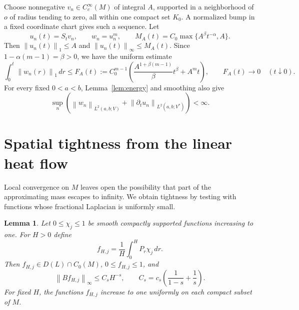 \documentclass[11pt]{article}
\newtheorem{lemma}[theorem]{Lemma}
\theoremstyle{remark}
\newcommand{\norm}[1]{\left\lVert#1\right\rVert}
\begin{document}
Choose nonnegative $v_n\in C_c^\infty(M)$ of integral $A$, supported
in a neighborhood of $o$ of radius tending to zero, all within one
compact set $K_0$. A normalized bump in a fixed coordinate chart gives
such a sequence. Let
\[
 u_n(t)=S_tv_n,\qquad w_n=u_n^m,
 \qquad M_A(t)=C_0\max\{A^\beta t^{-\alpha},A\}.
\]
Then $\norm{u_n(t)}_1\le A$ and $\norm{u_n(t)}_\infty\le M_A(t)$.
Since $1-\alpha(m-1)=\beta>0$, we have the uniform estimate
\begin{equation}\label{eq:flux}
 \int_0^t\norm{w_n(r)}_1\,dr\le F_A(t):=
 C_0^{m-1}\left(
 \frac{A^{1+\beta(m-1)}}{\beta}t^\beta+A^mt\right),
 \qquad F_A(t)\longrightarrow0\quad(t\downarrow0).
\end{equation}
For every fixed $0<a<b$, Lemma~\ref{lem:energy} and smoothing also give
\begin{equation}\label{eq:uniformenergy}
 \sup_n\left(\norm{w_n}_{L^2(a,b;V)}+
       \norm{\partial_tu_n}_{L^2(a,b;V^*)}\right)<\infty.
\end{equation}

\section{Spatial tightness from the linear heat flow}

Local convergence on $M$ leaves open the possibility that part of the
approximating mass escapes to infinity. We obtain tightness by testing
with functions whose fractional Laplacian is uniformly small.

\begin{lemma}\label{lem:averages}
Let $0\le\chi_j\le1$ be smooth compactly supported functions increasing
to one. For $H>0$ define
\begin{equation}\label{eq:average}
 f_{H,j}=\frac1H\int_0^H P_r\chi_j\,dr.
\end{equation}
Then $f_{H,j}\in D(L)\cap C_0(M)$, $0\le f_{H,j}\le1$, and
\begin{equation}\label{eq:averagebound}
 \norm{Bf_{H,j}}_\infty\le C_s H^{-s},
 \qquad C_s=c_s\left(\frac1{1-s}+\frac1s\right).
\end{equation}
For fixed $H$, the functions $f_{H,j}$ increase to one uniformly on
each compact subset of $M$.
\end{lemma}
\end{document}
